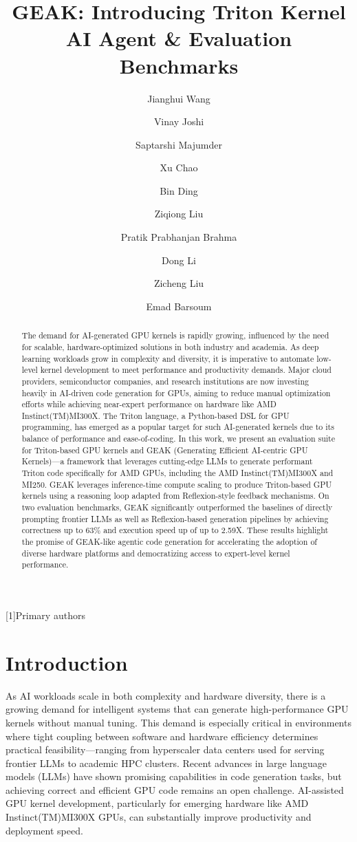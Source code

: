 \documentclass{llncs}
\title{GEAK: Introducing Triton Kernel AI Agent \& Evaluation Benchmarks}
\author{Jianghui Wang\inst{1} \and Vinay Joshi\inst{2} \and Saptarshi Majumder\inst{3} \and Xu Chao\inst{4} \and Bin Ding\inst{5} \and Ziqiong Liu\inst{6} \and Pratik Prabhanjan Brahma\inst{7} \and Dong Li\inst{8} \and Zicheng Liu\inst{9} \and Emad Barsoum\inst{10}
}
\institute{Unspecified \and Unspecified \and Unspecified \and Unspecified \and Unspecified \and Unspecified \and Unspecified \and Unspecified \and Unspecified \and Advanced Micro Devices, Inc. (AMD)
}
\providecommand{\texttrademark}{(TM)}
\begin{document}
\maketitle

\begin{abstract}
The demand for AI-generated GPU kernels is rapidly growing, influenced by the need for scalable, hardware-optimized solutions in both industry and academia. As deep learning workloads grow in complexity and diversity, it is imperative to automate low-level kernel development to meet performance and productivity demands. Major cloud providers, semiconductor companies, and research institutions are now investing heavily in AI-driven code generation for GPUs, aiming to reduce manual optimization efforts while achieving near-expert performance on hardware like AMD Instinct\texttrademark MI300X. The Triton language, a Python-based DSL for GPU programming, has emerged as a popular target for such AI-generated kernels due to its balance of performance and ease-of-coding. In this work, we present an evaluation suite for Triton-based GPU kernels and GEAK (Generating Efficient AI-centric GPU Kernels)---a framework that leverages cutting-edge LLMs to generate performant Triton code specifically for AMD GPUs, including the AMD Instinct\texttrademark MI300X and MI250. GEAK leverages inference-time compute scaling to produce Triton-based GPU kernels using a reasoning loop adapted from Reflexion-style feedback mechanisms. On two evaluation benchmarks, GEAK significantly outperformed the baselines of directly prompting frontier LLMs as well as Reflexion-based generation pipelines by achieving correctness up to $63$\% and execution speed up of up to 2.59X. These results highlight the promise of GEAK-like agentic code generation for accelerating the adoption of diverse hardware platforms and democratizing access to expert-level kernel performance.
\end{abstract}



[1]Primary authors
\section{Introduction}
As AI workloads scale in both complexity and hardware diversity, there is a growing demand for intelligent systems that can generate high-performance GPU kernels without manual tuning. This demand is especially critical in environments where tight coupling between software and hardware efficiency determines practical feasibility---ranging from hyperscaler data centers used for serving frontier LLMs to academic HPC clusters. Recent advances in large language models (LLMs) have shown promising capabilities in code generation tasks, but achieving correct and efficient GPU code remains an open challenge. AI-assisted GPU kernel development, particularly for emerging hardware like AMD Instinct\texttrademark MI300X GPUs, can substantially improve productivity and deployment speed.
\end{document}
